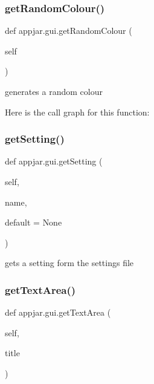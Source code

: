 \subsubsection{\texorpdfstring{get\+Random\+Colour()}{getRandomColour()}}
{\footnotesize\ttfamily def appjar.\+gui.\+get\+Random\+Colour (\begin{DoxyParamCaption}\item[{}]{self }\end{DoxyParamCaption})}

\begin{DoxyVerb}generates a random colour \end{DoxyVerb}
 Here is the call graph for this function\+:
\mbox{\label{classappjar_1_1gui_a85dbd7d7177d4fa238d1c6ef1452685d}} 
\subsubsection{\texorpdfstring{get\+Setting()}{getSetting()}}
{\footnotesize\ttfamily def appjar.\+gui.\+get\+Setting (\begin{DoxyParamCaption}\item[{}]{self,  }\item[{}]{name,  }\item[{}]{default = {\ttfamily None} }\end{DoxyParamCaption})}

\begin{DoxyVerb}gets a setting form the settings file \end{DoxyVerb}
 \mbox{\label{classappjar_1_1gui_ad1565f18558656d50460171506cce7ee}} 
\subsubsection{\texorpdfstring{get\+Text\+Area()}{getTextArea()}}
{\footnotesize\ttfamily def appjar.\+gui.\+get\+Text\+Area (\begin{DoxyParamCaption}\item[{}]{self,  }\item[{}]{title }\end{DoxyParamCaption})}

